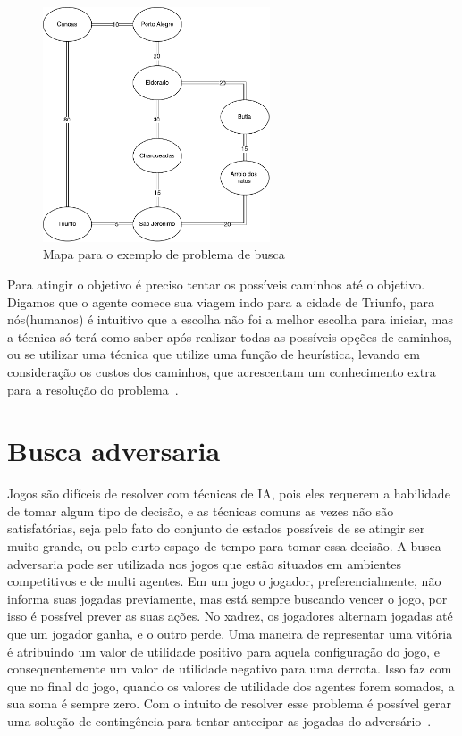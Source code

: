\begin{figure}[ht]
	\centering
	\includegraphics[width=0.6\textwidth]{fig/mapabusca.pdf}
	\caption{Mapa para o exemplo de problema de busca}
	\label{fig:mapabusca}
\end{figure} 

Para atingir o objetivo é preciso tentar os possíveis caminhos até o objetivo. 
Digamos que o agente comece sua viagem indo para a cidade de Triunfo, para nós(humanos) é intuitivo que a escolha não foi a melhor escolha para iniciar, mas a técnica só terá como saber após realizar todas as possíveis opções de caminhos, ou se utilizar uma técnica que utilize uma função de heurística, levando em consideração os custos dos caminhos, que acrescentam um conhecimento extra para a resolução do problema~\cite[Capítulo 3]{intelligence2003modern}.

\section{Busca adversaria}

Jogos são difíceis de resolver com técnicas de IA, pois eles requerem a habilidade de tomar algum tipo de decisão, e as técnicas comuns as vezes não são satisfatórias, seja pelo fato do conjunto de estados possíveis de se atingir ser muito grande, ou pelo curto espaço de tempo para tomar essa decisão.
A busca adversaria pode ser utilizada nos jogos que estão situados em ambientes competitivos e de multi agentes.
Em um jogo o jogador, preferencialmente, não informa suas jogadas previamente, mas está sempre buscando vencer o jogo, por isso é possível prever as suas ações.
No xadrez, os jogadores alternam jogadas até que um jogador ganha, e o outro perde. Uma maneira de representar uma vitória é atribuindo um valor de utilidade positivo para aquela configuração do jogo, e consequentemente um valor de utilidade negativo para uma derrota. Isso faz com que no final do jogo, quando os valores de utilidade dos agentes forem somados, a sua soma é sempre zero. 
Com o intuito de resolver esse problema é possível gerar uma solução de contingência para tentar antecipar as jogadas do adversário~\cite[Capítulo 5]{intelligence2003modern}. 


